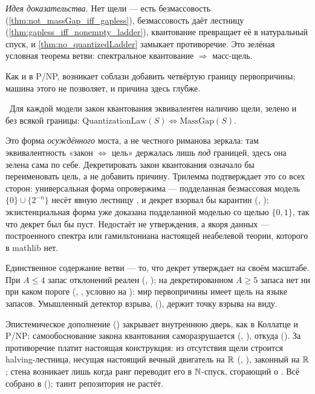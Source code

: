 \emph{Идея доказательства.} Нет щели --- есть безмассовость (\cref{thm:not_massGap_iff_gapless}),
безмассовость даёт лестницу (\cref{thm:gapless_iff_nonempty_ladder}), квантование превращает её в
натуральный спуск, и \cref{thm:no_quantizedLadder} замыкает противоречие. Это зелёная условная теорема
ветви: спектральное квантование $\Rightarrow$ масс-щель.

Как и в P/NP, возникает соблазн добавить четвёртую границу первопричины; машина этого не позволяет, и
причина здесь глубже.

\begin{theorem}\label{thm:quantizationLaw_iff_massGap}
\green{}\ Для каждой модели закон квантования эквивалентен наличию щели, зелено и без всякой границы:
$\mathrm{QuantizationLaw}(S)\iff\mathrm{MassGap}(S)$.
\end{theorem}

Это форма \emph{осуждённого} моста, а не честного риманова зеркала: там эквивалентность «закон $\iff$
цель» держалась лишь \emph{под} границей, здесь она зелена сама по себе. Декретировать закон квантования
означало бы переименовать цель, а не добавить причину. Трилемма подтверждает это со всех сторон:
универсальная форма опровержима --- подделанная безмассовая модель $\{0\}\cup\{2^{-n}\}$ несёт явную
лестницу , и декрет взорвал бы карантин
(, \green{}); экзистенциальная форма уже доказана
подделанной моделью со щелью $\{0,1\}$, так что декрет был бы пуст. Недостаёт не утверждения, а
\red{} якоря данных --- построенного спектра или гамильтониана настоящей неабелевой теории, которого в
mathlib нет.

Единственное \yellow{} содержание ветви --- то, что декрет утверждает на своём масштабе. При $A\le 4$
запас отклонений реален (, \green{}); на декретированном $A\ge 5$
запаса нет ни при каком пороге (, \yellow{}, условно на
\axiom{}): мир первопричины имеет щель на языке запасов. Умышленный детектор взрыва,
 (\yellow{}), держит точку взрыва на виду.

Эпистемическое дополнение () закрывает внутреннюю дверь, как в
Коллатце и P/NP: самообоснование закона квантования саморазрушается
(, \green{}), откуда  (\green{}). За
противоречие платит настоящая конструкция: из отсутствия щели строится halving-лестница, несущая
настоящий вечный двигатель на $\mathbb{R}$ (, \green{}), законный на
$\mathbb{R}$; стена возникает лишь когда ранг переводит его в $\mathbb{N}$-спуск, сгорающий о
. Всё собрано в 
(\green{}); таинт репозитория не растёт.

